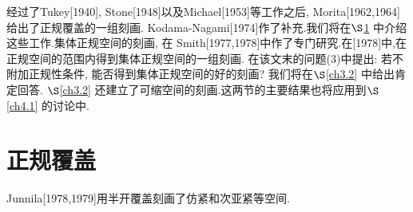 \documentclass[main.tex]{subfiles}
\begin{document}
经过了Tukey[1940], Stone[1948]以及Michael[1953]等工作之后, Morita[1962,1964]给出了正规覆盖的一组刻画.
Kodama-Nagami[1974]作了补充.我们将在$\S$\ref{ch3.1} 中介绍这些工作.集体正规空间的刻画,
在 Smith[1977,1978]中作了专门研究.在[1978]中,在正规空间的范围内得到集体正规空间的一组刻画.
在该文末的问题(3)中提出: 若不附加正规性条件,
能否得到集体正规空间的好的刻画?
我们将在$\S$\ref{ch3.2} 中给出肯定回答.
$\S$\ref{ch3.2} 还建立了可缩空间的刻画.这两节的主要结果也将应用到$\S$\ref{ch4.1} 的讨论中.


\section{正规覆盖}\label{ch3.1}
Junnila[1978,1979]用半开覆盖刻画了仿紧和次亚紧等空间.

	
\end{document}
